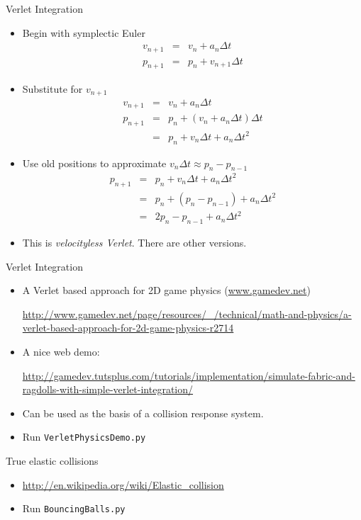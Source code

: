 \documentclass[handout,t,compress]{beamer}
\newcommand{\bframe}[1]{\begin{frame}[fragile]{#1}}
\begin{document}
\bframe{Verlet Integration}
\begin{itemize}
\item Begin with symplectic Euler
\begin{eqnarray*}
v_{n+1} &=& v_{n} + a_{n}\Delta t\\
p_{n+1} &=& p_{n} + v_{n+1}\Delta t
\end{eqnarray*}
\item Substitute for $v_{n+1}$
\begin{eqnarray*}
v_{n+1} &=& v_{n} + a_{n}\Delta t\\
p_{n+1} &=& p_{n} + (v_{n} + a_{n}\Delta t)\Delta t\\
       &=& p_{n} + v_{n}\Delta t + a_{n}\Delta t^2
\end{eqnarray*}
\item Use old positions to approximate $v_n\Delta t \approx p_n - p_{n-1}$
\begin{eqnarray*}
p_{n+1} &=& p_{n} + v_{n}\Delta t + a_{n}\Delta t^2\\
       &=& p_{n} + (p_{n} - p_{n-1}) + a_{n}\Delta t^2\\
       &=& 2p_{n} - p_{n-1} + a_{n}\Delta t^2
\end{eqnarray*}
\item This is {\em velocityless Verlet}.  There are other versions.
\end{itemize}
\end{frame}

\bframe{Verlet Integration}
\begin{itemize}
\item A Verlet based approach for 2D game physics (\url{www.gamedev.net})

{\tiny\url{http://www.gamedev.net/page/resources/_/technical/math-and-physics/a-verlet-based-approach-for-2d-game-physics-r2714}}
\item A nice web demo:

{\tiny\url{http://gamedev.tutsplus.com/tutorials/implementation/simulate-fabric-and-ragdolls-with-simple-verlet-integration/}}
\item Can be used as the basis of a collision response system.
\item Run {\tt VerletPhysicsDemo.py}
\end{itemize}
\end{frame}


\bframe{True elastic collisions}
\begin{itemize}
\item \url{http://en.wikipedia.org/wiki/Elastic_collision}
\item Run {\tt BouncingBalls.py}
\end{itemize}

\end{frame}
\end{document}

